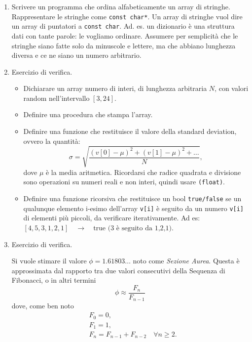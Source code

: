 \documentclass{article}
\begin{document}
\begin{enumerate}
\item Scrivere un programma che ordina alfabeticamente un array di stringhe. Rappresentare le stringhe come \texttt{const char*}. Un array di stringhe vuol dire un array di puntatori a \texttt{const char}. Ad. es. un dizionario è una struttura dati con tante parole: le vogliamo ordinare. Assumere per semplicità che le stringhe siano fatte solo da minuscole e lettere, ma che abbiano lunghezza diversa e ce ne siano un numero arbitrario.


\item Esercizio di verifica.

\begin{itemize}
\item Dichiarare un array numero di interi, di lunghezza arbitraria $N$, con valori random nell'intervallo $[3, 24]$.
\item Definire una procedura che stampa l'array.
\item Definire una funzione che restituisce il valore della standard deviation, ovvero la quantit\`{a}:
\begin{equation}
\sigma = \sqrt{\frac{\left( v[0] - \mu \right)^2 + \left( v[1] - \mu \right)^2 + \ldots }{N}},
\end{equation}
dove $\mu$ \`{e} la media aritmetica. Ricordarsi che radice quadrata e divisione sono operazioni su numeri reali e non interi, quindi usare \texttt{(float)}.
\item Definire una funzione ricorsiva che restituisce un bool \texttt{true/false} se un qualunque elemento i-esimo dell'array \texttt{v[i]} \`{e} seguito da un numero \texttt{v[i]} di elementi pi\`{u} piccoli, da verificare iterativamente. Ad es: $[4, 5, 3, 1, 2, 1]  \quad \rightarrow \quad \textrm{true (3 \`{e} seguito da 1,2,1)}$.
\end{itemize}

\item Esercizio di verifica.

Si vuole stimare il valore $\phi = 1.61803\ldots$ noto come \emph{Sezione Aurea}. Questa è approssimata dal rapporto tra due valori consecutivi della Sequenza di Fibonacci, o in altri termini
	\begin{equation}
	\phi \approx \frac{F_{n}}{F_{n-1}}
	\end{equation}
	dove, come ben noto
	\begin{align*}
	&F_{0}=0,\\
	&F_{1}=1,\\
	&F_{n} = F_{n-1} + F_{n-2} \quad  \forall n\geq 2.
	\end{align*}


\end{enumerate}
\end{document}
